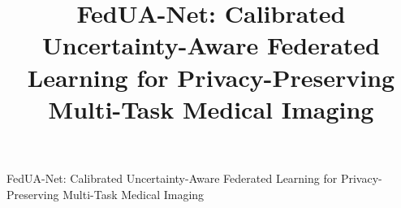 \documentclass[journal]{IEEEtran}
\begin{document}
\title{FedUA-Net: Calibrated Uncertainty-Aware Federated Learning for Privacy-Preserving Multi-Task Medical Imaging}

\author{}

%
{FedUA-Net: Calibrated Uncertainty-Aware Federated Learning for Privacy-Preserving Multi-Task Medical Imaging}

\maketitle

\setlength{\textfloatsep}{7pt plus 1.0pt minus 1.5pt}
\setlength{\floatsep}{5pt plus 1.0pt minus 1.0pt}
\setlength{\intextsep}{5pt plus 1.0pt minus 1.0pt}
\setlength{\dbltextfloatsep}{7pt plus 1.0pt minus 1.5pt}
\setlength{\dblfloatsep}{5pt plus 1.0pt minus 1.0pt}
\end{document}
